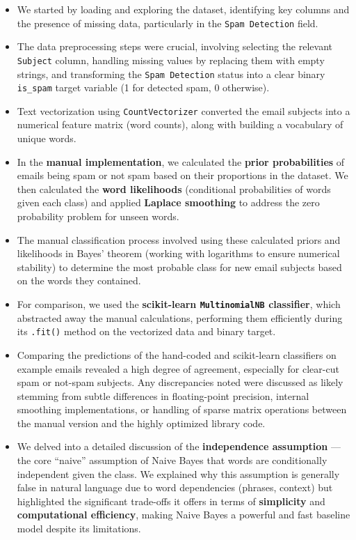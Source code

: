 \documentclass[12pt,letterpaper]{article}
\begin{document}
\begin{itemize}
    \item We started by loading and exploring the dataset, identifying key columns and the presence of missing data, particularly in the \texttt{Spam Detection} field.
    
    \item The data preprocessing steps were crucial, involving selecting the relevant \texttt{Subject} column, handling missing values by replacing them with empty strings, and transforming the \texttt{Spam Detection} status into a clear binary \texttt{is\_spam} target variable (1 for detected spam, 0 otherwise).
    
    \item Text vectorization using \texttt{CountVectorizer} converted the email subjects into a numerical feature matrix (word counts), along with building a vocabulary of unique words.
    
    \item In the \textbf{manual implementation}, we calculated the \textbf{prior probabilities} of emails being spam or not spam based on their proportions in the dataset. We then calculated the \textbf{word likelihoods} (conditional probabilities of words given each class) and applied \textbf{Laplace smoothing} to address the zero probability problem for unseen words.
    
    \item The manual classification process involved using these calculated priors and likelihoods in Bayes' theorem (working with logarithms to ensure numerical stability) to determine the most probable class for new email subjects based on the words they contained.
    
    \item For comparison, we used the \textbf{scikit-learn \texttt{MultinomialNB} classifier}, which abstracted away the manual calculations, performing them efficiently during its \texttt{.fit()} method on the vectorized data and binary target.
    
    \item Comparing the predictions of the hand-coded and scikit-learn classifiers on example emails revealed a high degree of agreement, especially for clear-cut spam or not-spam subjects. Any discrepancies noted were discussed as likely stemming from subtle differences in floating-point precision, internal smoothing implementations, or handling of sparse matrix operations between the manual version and the highly optimized library code.
    
    \item We delved into a detailed discussion of the \textbf{independence assumption} --- the core ``naive'' assumption of Naive Bayes that words are conditionally independent given the class. We explained why this assumption is generally false in natural language due to word dependencies (phrases, context) but highlighted the significant trade-offs it offers in terms of \textbf{simplicity} and \textbf{computational efficiency}, making Naive Bayes a powerful and fast baseline model despite its limitations.
\end{itemize}
\end{document}
